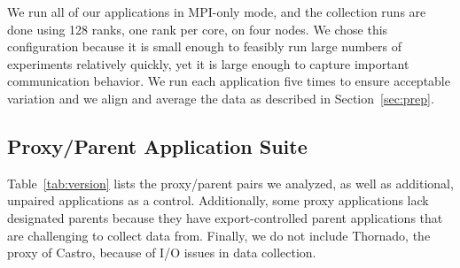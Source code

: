 We run all of our applications in MPI-only mode, and the collection
runs are done using 128 ranks, one rank per core, on four nodes.
We chose this configuration because it is small enough to feasibly 
run large numbers of experiments relatively quickly, yet it is large 
enough to capture important communication behavior.  We run each application
five times to ensure acceptable variation and we align and average the data 
as described in Section~\ref{sec:prep}.


\subsection{Proxy/Parent Application Suite}
Table~\ref{tab:version} lists the proxy/parent pairs we analyzed, as well as additional, unpaired applications as a control.
%
Additionally, some proxy applications lack designated parents because they have export-controlled parent applications that are challenging to collect data from. Finally, we do not include Thornado, the proxy of Castro, because of I/O issues in data collection. %


